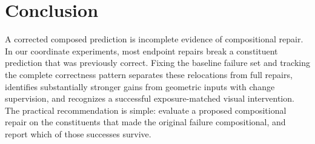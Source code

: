 \hypertarget{conclusion}{%
\section{Conclusion}\label{conclusion}}

A corrected composed prediction is incomplete evidence of compositional repair. In our coordinate experiments, most endpoint repairs break a constituent prediction that was previously correct. Fixing the baseline failure set and tracking the complete correctness pattern separates these relocations from full repairs, identifies substantially stronger gains from geometric inputs with change supervision, and recognizes a successful exposure-matched visual intervention. The practical recommendation is simple: evaluate a proposed compositional repair on the constituents that made the original failure compositional, and report which of those successes survive.

